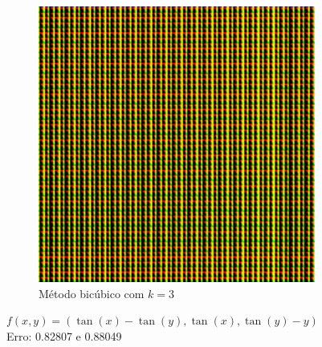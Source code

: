 \documentclass[leqno]{article}
\begin{document}
\begin{figure}[H]
\begin{subfigure}{.33\textwidth}
        \includegraphics[width=.7\linewidth]{../images/func_2_color_bic.png}
        \caption{Método bicúbico com $k = 3$}
        \label{fig:sub1}
      \end{subfigure}%
    \caption{$f(x,y) = (\tan(x) - \tan(y), \tan(x), \tan(y) - y)$ \\ Erro: 0.82807 e 0.88049}
    \label{fig:test}
\end{figure}
\end{document}
